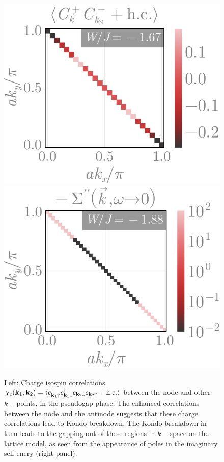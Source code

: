 \documentclass[%
 reprint,
superscriptaddress,
groupedaddress,
 amsmath,amssymb,
 aps,
prl
]{revtex4-2}
\begin{document}
\begin{figure}
    \centering
    \includegraphics[width=0.49\linewidth]{cfnode-2.pdf}
    \includegraphics[width=0.49\linewidth]{selfEnergyKspace-3.pdf}
    \caption{Left: Charge isospin correlations $\chi_c({\bf k}_1, {\bf k}_2) = \braket{c^\dagger_{{\bf k}_1\uparrow}c^\dagger_{{\bf k}_1\downarrow}c_{{\bf k}_2\downarrow}c_{{\bf k}_2\uparrow} + \text{h.c.}}$ between the node and other $k-$points, in the pseudogap phase. The enhanced correlations between the node and the antinode suggests that these charge correlations lead to Kondo breakdown. The Kondo breakdown in turn leads to the gapping out of these regions in $k-$space on the lattice model, as seen from the appearance of poles in the imaginary self-enery (right panel).}
    \label{chargeCorr}
\end{figure}
\end{document}
